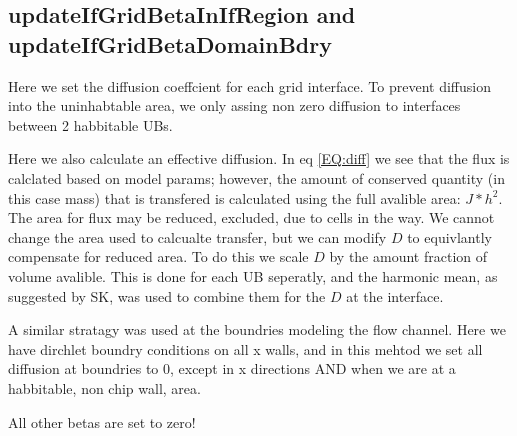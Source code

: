 \documentclass{article}
\begin{document}
\subsection{updateIfGridBetaInIfRegion and updateIfGridBetaDomainBdry}
Here we set the diffusion coeffcient for each grid interface.
To prevent diffusion into the uninhabtable area, 
we only assing non zero diffusion to interfaces between 2 habbitable UBs.

Here we also calculate an effective diffusion.
In eq \ref{EQ:diff} we see that the flux is calclated based on model params;
however, the amount of conserved quantity (in this case mass) that is transfered is calculated using the full avalible area: $J*h^2$.
The area for flux may be reduced, excluded, due to cells in the way.
We cannot change the area used to calcualte transfer,
but we can modify $D$ to equivlantly compensate for reduced area.
To do this we scale $D$ by the amount fraction of volume avalible.
This is done for each UB seperatly, and the harmonic mean,
as suggested by SK, was used to combine them for the $D$ at the interface.

A similar stratagy was used at the boundries modeling the flow channel.
Here we have dirchlet boundry conditions on all x walls,
and in this mehtod we set all diffusion at boundries to 0, except 
in x directions AND when we are at a habbitable, non chip wall, area.
 
All other betas are set to zero!
\end{document}
